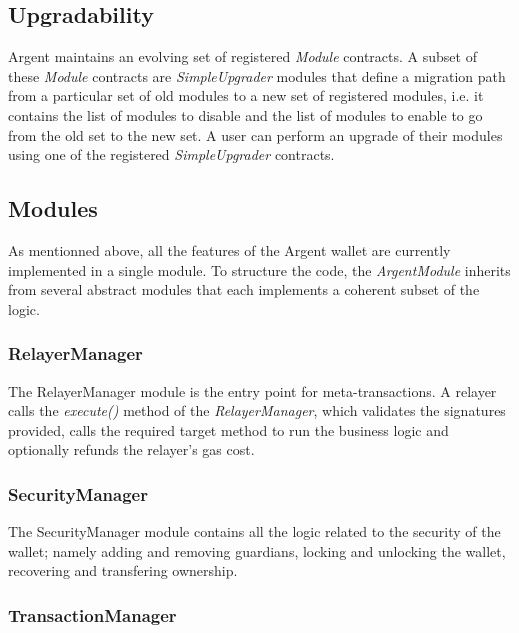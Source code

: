 \documentclass[12pt]{article}
\begin{document}
\subsection{Upgradability}
\label{sec:upgradability}
Argent maintains an evolving set of registered \emph{Module} contracts. A subset of these \emph{Module} contracts are \emph{SimpleUpgrader} modules that define a migration path from a particular set of old modules to a new set of registered modules, i.e. it contains the list of modules to disable and the list of modules to enable to go from the old set to the new set. A user can perform an upgrade of their modules using one of the registered \emph{SimpleUpgrader} contracts.

\subsection{Modules}
As mentionned above, all the features of the Argent wallet are currently implemented in a single module. To structure the code, the \emph{ArgentModule} inherits from several abstract modules that each implements a coherent subset of the logic.

\subsubsection{RelayerManager}\label{RelayerManager}

The RelayerManager module is the entry point for meta-transactions. A relayer calls the \emph{execute()} method of the \emph{RelayerManager}, which validates the signatures provided, calls the required target method to run the business logic and optionally refunds the relayer's gas cost.

\subsubsection{SecurityManager}

The SecurityManager module contains all the logic related to the security of the wallet; namely adding and removing guardians, locking and unlocking the wallet, recovering and transfering ownership.

\subsubsection{TransactionManager}
\end{document}
